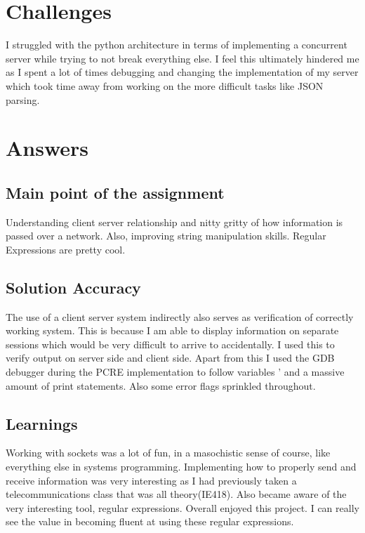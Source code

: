 \documentclass[letterpaper,10pt,titlepage]{article}
\begin{document}
\section{Challenges}
I struggled with the python architecture in terms of implementing a concurrent server while trying to not break everything else. 
I feel this ultimately hindered me as I spent a lot of times debugging and changing the implementation of my server which took time 
away from working on the more difficult tasks like JSON parsing. 


\section{Answers}
\subsection{Main point of the assignment}
Understanding client server relationship and nitty gritty of how information is passed over a network. 
Also, improving string manipulation skills. Regular Expressions are pretty cool.

\subsection{Solution Accuracy}
The use of a client server system indirectly also serves as verification of  correctly working system.
This is because I am able to display information on separate sessions which would be very difficult
to arrive to accidentally. I used this to verify output on server side and client side.
Apart from this I used the GDB debugger during the PCRE implementation to follow variables '
and a massive amount of print statements. Also some error flags sprinkled throughout.


\subsection{Learnings}
Working with sockets was a lot of fun, in a masochistic sense of course, like everything else in systems programming.
Implementing how to properly send and receive information was very interesting as I had previously taken a
telecommunications class that was all theory(IE418).
Also became aware of the very interesting tool, regular expressions. Overall enjoyed this project.
I can really see the value in becoming fluent at using these regular expressions.
\end{document}
